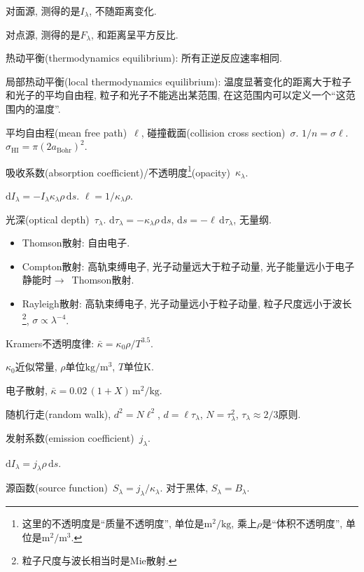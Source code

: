 对面源, 测得的是$I_\lambda$, 不随距离变化.

对点源, 测得的是$F_\lambda$, 和距离呈平方反比.

热动平衡(thermodynamics equilibrium): 所有正逆反应速率相同.

局部热动平衡(local thermodynamics equilibrium): 温度显著变化的距离大于粒子和光子的平均自由程, 粒子和光子不能逃出某范围, 在这范围内可以定义一个``这范围内的温度''.

平均自由程(mean free path)~$\ell$, 碰撞截面(collision cross section)~$\sigma$. $1/n=\sigma\ell$. $\sigma_\text{HI}=\pi(2a_\text{Bohr})^2$.

吸收系数(absorption coefficient)/不透明度\footnote{
    这里的不透明度是``质量不透明度'', 单位是$\text{m}^2/\text{kg}$, 乘上$\rho$是``体积不透明度'', 单位是$\text{m}^2/\text{m}^3$.
}(opacity)~$\kappa_\lambda$.

$\mathrm{d}I_\lambda
=-I_\lambda\kappa_\lambda\rho\,\mathrm{d}s$.
$\ell=1/\kappa_\lambda\rho$.

光深(optical depth)~$\tau_\lambda$.
$\mathrm{d}\tau_\lambda=-\kappa_\lambda\rho\,\mathrm{d}s$, $\mathrm{d}s=-\ell\,\mathrm{d}\tau_\lambda$, 无量纲.

\begin{itemize}
    \item Thomson散射: 自由电子.
    \item Compton散射: 高轨束缚电子, 光子动量远大于粒子动量, 光子能量远小于电子静能时$\to$~Thomson散射.
    \item Rayleigh散射: 高轨束缚电子, 光子动量远小于粒子动量, 粒子尺度远小于波长\footnote{粒子尺度与波长相当时是Mie散射.}, $\sigma \propto \lambda^{-4}$.
\end{itemize}

Kramers不透明度律: $\bar{\kappa}=\kappa_0\rho/T^{3.5}$.

$\kappa_0$近似常量, $\rho$单位$\text{kg}/\text{m}^3$, $T$单位$\text{K}$.

电子散射, $\bar{\kappa}=0.02\,(1+X)\,\text{m}^2/\text{kg}$.

随机行走(random walk), $d^2=N\ell^2$, $d=\ell\tau_\lambda$, $N=\tau_\lambda^2$, $\tau_\lambda\approx 2/3$原则.

发射系数(emission coefficient)~$j_\lambda$.

$\mathrm{d}I_\lambda
=j_\lambda\rho\,\mathrm{d}s$.

源函数(source function)~$S_\lambda=j_\lambda/\kappa_\lambda$. 对于黑体, $S_\lambda=B_\lambda$.

